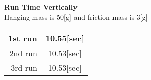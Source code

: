 \documentclass[12pt,letterpaper,fleqn]{article}
\begin{document}
\begin{center}
{\large\bf Run Time Vertically}
\\ Hanging mass is 50[g] and friction mass is 3[g]
\end{center}
\begin{table}
\begin{center}
\begin{tabular}{|r||c|}
	1st run & 10.55[sec]\\\hline
	2nd run & 10.53[sec]\\\hline
	3rd run & 10.53[sec]\\\hline
\end{tabular}
\end{center}
\end{table}
\end{document}
